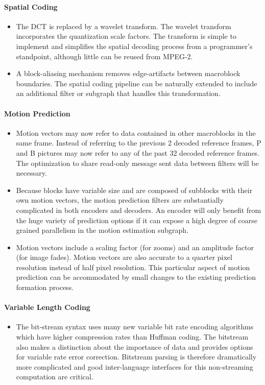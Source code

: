 \paragraph{Spatial Coding}
\begin{itemize}
\item The DCT is replaced by a wavelet transform. The 
wavelet transform incorporates the quantization scale 
factors. The transform is simple to implement and 
simplifies the spatial decoding process from a 
programmer's standpoint, although little can be reused 
from MPEG-2.
\item A block-aliasing mechanism removes edge-artifacts between 
macroblock boundaries. The spatial coding pipeline can be
naturally extended to include an additional filter or 
subgraph that handles this transformation.
\end{itemize}

\paragraph{Motion Prediction}
\begin{itemize}
\item Motion vectors may now refer to data contained in other 
macroblocks in the same frame. Instead of referring to the 
previous 2 decoded reference frames, P and B pictures may 
now refer to any of the past 32 decoded reference frames. 
The optimization to share read-only message sent data
between filters will be necessary.
\item Because blocks have variable size and are composed 
of subblocks with their own motion vectors, 
the motion prediction filters are substantially complicated
in both encoders and decoders. An encoder will only 
benefit from the huge variety of prediction options
if it can expose a high degree of coarse grained
parallelism in the motion estimation subgraph.
\item Motion vectors include a scaling factor (for zooms) 
and an amplitude factor (for image fades). 
Motion vectors are also accurate 
to a quarter pixel resolution instead of half pixel 
resolution. This particular aspect of motion prediction
can be accommodated by small changes to the existing
prediction formation process. 
\end{itemize}

\paragraph{Variable Length Coding}
\begin{itemize}
\item The bit-stream syntax uses many new variable bit 
rate encoding algorithms which have higher compression 
rates than Huffman coding. The bitstream also makes a 
distinction about the importance of data and provides 
options for variable rate error correction. Bitstream 
parsing is therefore dramatically more complicated and 
good inter-language interfaces for this non-streaming 
computation are critical.
\end{itemize}

